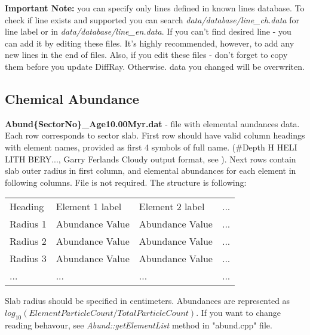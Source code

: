 \documentclass[a4paper]{article}
\begin{document}
    {\bf Important Note: } you can specify only lines defined in known lines database. To check if line exists
    and supported you can search {\it data/database/line\_ch.data} for line label or in {\it data/database/line\_en.data}.
    If you can't find desired line - you can add it by editing these files. It's highly recommended, however, to add any new lines
    in the end of files. Also, if you edit these files - don't forget to copy them before you update DiffRay. Otherwise.
    data you changed will be overwriten.

\subsection{Chemical Abundance}
\label{dataAbund}
{\bf Abund\{SectorNo\}\_Age10.00Myr.dat} - file with elemental aundances data. Each row
corresponds to sector slab. First row should have valid column headings
with element names, provided as first 4 symbols of full name. 
(\#Depth		H	HELI	LITH	BERY..., Garry Ferlands Cloudy output 
format, see \cite{Cloudy}).
Next rows contain slab outer radius in first column, 
and elemental abundances for each element in following columns. File is not required.
The structure is following:
\begin{table}[H]
    \begin{tabular}{llll}
        Heading & Element 1 label & Element 2 label & ...\\
        Radius 1 & Abundance Value & Abundance Value & ... \\
        Radius 2 & Abundance Value & Abundance Value & ... \\
        Radius 3 & Abundance Value & Abundance Value & ... \\
        ... & ... & ... & ... \\
    \end{tabular}
\end{table}
Slab radius should be specified in centimeters. Abundances are represented as $log_10(Element Particle Count / Total Particle Count)$.
If you want to change reading behavour, see {\it Abund::getElementList} method in "abund.cpp" file.
\end{document}
